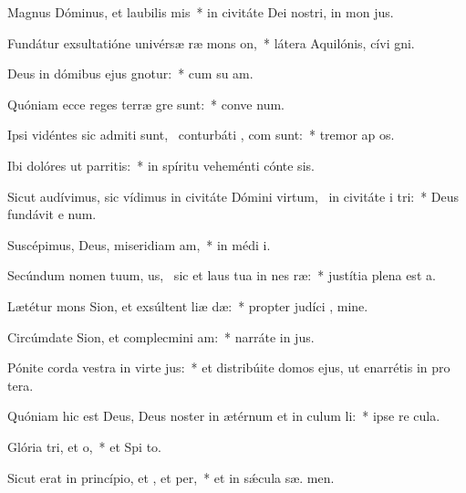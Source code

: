\item Magnus Dóminus, et laubilis mis~* in civitáte Dei nostri, in mon  jus.
\item Fundátur exsultatióne univérsæ ræ mons on,~* látera Aquilónis, cívi  gni.
\item Deus in dómibus ejus gnotur:~* cum su am.
\item Quóniam ecce reges terræ gre sunt:~* conve  num.
\item Ipsi vidéntes sic admiti sunt,~\pscross{} conturbáti , com sunt:~* tremor ap os.
\item Ibi dolóres ut parritis:~* in spíritu veheménti cónte  sis.
\item Sicut audívimus, sic vídimus in civitáte Dómini virtum,~\pscross{} in civitáte i tri:~* Deus fundávit e  num.
\item Suscépimus, Deus, miseridiam am,~* in médi  i.
\item Secúndum nomen tuum, us,~\pscross{} sic et laus tua in nes ræ:~* justítia plena est  a.
\item Lætétur mons Sion, et exsúltent liæ dæ:~* propter judíci , mine.
\item Circúmdate Sion, et complecmini am:~* narráte in  jus.
\item Pónite corda vestra in virte jus:~* et distribúite domos ejus, ut enarrétis in pro tera.
\item Quóniam hic est Deus, Deus noster in ætérnum et in culum li:~* ipse re   cula.
\item Glória tri, et o,~* et Spi to.
\item Sicut erat in princípio, et , et per,~* et in sǽcula sæ. men.
